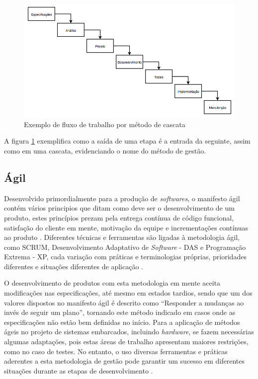 \begin{figure}[h]
\caption{Exemplo de fluxo de trabalho por método de cascata}    
\begin{centering}
\includegraphics[width=1\columnwidth]{images/meth/Meth-Waterfall.png}
\par\end{centering}

\label{fig:Meth-Waterfall}

\end{figure}

A figura \ref{fig:Meth-Waterfall} exemplifica como a saída de uma etapa é a entrada da seguinte, assim como em uma cascata, evidenciando o nome do método de gestão.


\subsection{Ágil}
Desenvolvido primordialmente para a produção de \textit{softwares}, o manifesto ágil contém vários principios que ditam como deve ser o desenvolvimento de um 
produto, estes princípios prezam pela entrega contínua de código funcional, satisfação do cliente em mente, motivação da equipe e incrementações contínuas 
ao produto \cite{beck2001manifesto}. Diferentes técnicas e ferramentas são ligadas à metodologia ágil, como SCRUM, Desenvolvimento Adaptativo de \textit{Software} - DAS e Programação 
Extrema - XP, cada variação com práticas e terminologias próprias, prioridades diferentes e situações diferentes de aplicação \cite{kaisti2013agile}. 

O desenvolvimento de produtos com esta metodologia em mente aceita modificações nas especificações, até mesmo em estados tardios, sendo que um dos valores 
dispostos no manifesto ágil \cite{beck2001manifesto} é descrito como ``Responder a mudanças ao invés de seguir um plano'', tornando este método indicado em casos
onde as especificações não estão bem definidas no início. Para a aplicação de métodos ágeis no projeto de sistemas embarcados, incluindo \textit{hardware}, se 
fazem necessárias algumas adaptações, pois estas áreas de trabalho apresentam maiores restrições, como no caso de testes. No entanto, o uso diversas 
ferramentas e práticas aderentes a esta metodologia de gestão pode garantir um sucesso em diferentes situações durante as etapas de desenvolvimento \cite{kaisti2013agile}.

